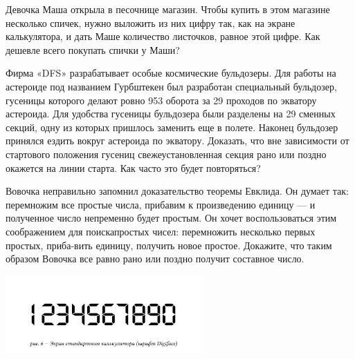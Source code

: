 \begin{itemize}
\itA Девочка Маша открыла в песочнице магазин. Чтобы купить в этом магазине несколько спичек, нужно выложить из них цифру так, как на экране калькулятора, и дать Маше количество листочков, равное этой цифре. Как дешевле всего покупать спички у Маши?

\itB Фирма «DFS» разрабатывает особые космические бульдозеры. Для работы на астероиде под названием Гурбштекен был разработан специальный бульдозер, гусеницы которого делают ровно 953 оборота за 29 проходов по экватору астероида. Для удобства гусеницы бульдозера были разделены на 29 сменных секций, одну из которых пришлось заменить еще в полете. Наконец бульдозер принялся ездить вокруг астероида по экватору. Доказать, что вне зависимости от стартового положения гусениц свежеустановленная секция рано или поздно окажется на линии старта. Как часто это будет повторяться?

\itC Вовочка неправильно запомнил доказательство теоремы Евклида. Он думает так: перемножим все простые числа, прибавим к произведению единицу --- и полученное число непременно будет простым. Он хочет воспользоваться этим соображением для поиска\linebreak простых чисел: перемножить несколько первых простых, приба-\linebreak вить единицу, получить новое простое. Докажите, что таким образом Вовочка все равно рано или поздно получит составное число.
\end{itemize}

\begin{center}
  \includegraphics[width=7.5cm]{stats/2016/Figures/Digiface.png}
\end{center}
